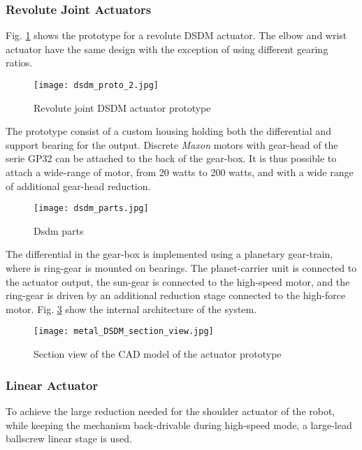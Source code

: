 \subsubsection{Revolute Joint Actuators}

Fig. \ref{fig:dsdm_act} shows the prototype for a revolute DSDM actuator. The elbow and wrist actuator have the same design with the exception of using different gearing ratios.

\begin{figure}[htp]
	\centering
		\texttt{[image: dsdm\_proto\_2.jpg]}
	\caption{Revolute joint DSDM actuator prototype } %
	\label{fig:dsdm_act}
\end{figure}

The prototype consist of a custom housing holding both the differential and support bearing for the output. Discrete \textit{Maxon} motors with gear-head of the serie GP32 can be attached to the back of the gear-box. It is thus possible to attach a wide-range of motor, from 20 watts to 200 watts, and with a wide range of additional gear-head reduction. 

\begin{figure}[htbp]
	\centering
		\texttt{[image: dsdm\_parts.jpg]}
	\caption{Dsdm parts}
	\label{fig:dsdm_parts}
\end{figure}


The differential in the gear-box is implemented using a planetary gear-train, where is ring-gear is mounted on bearings. The planet-carrier unit is connected to the actuator output, the sun-gear is connected to the high-speed motor, and the ring-gear is driven by an additional reduction stage connected to the high-force motor. Fig. \ref{fig:dsdm_section} show the internal architecture of the system.


\begin{figure}[htp]
	\centering
		\texttt{[image: metal\_DSDM\_section\_view.jpg]}
	\caption{Section view of the CAD model of the actuator prototype} %
	\label{fig:dsdm_section}
\end{figure}


\subsubsection{Linear Actuator}

To achieve the large reduction needed for the shoulder actuator of the robot, while keeping the mechanism back-drivable during high-speed mode, a large-lead ballscrew linear stage is used. 


